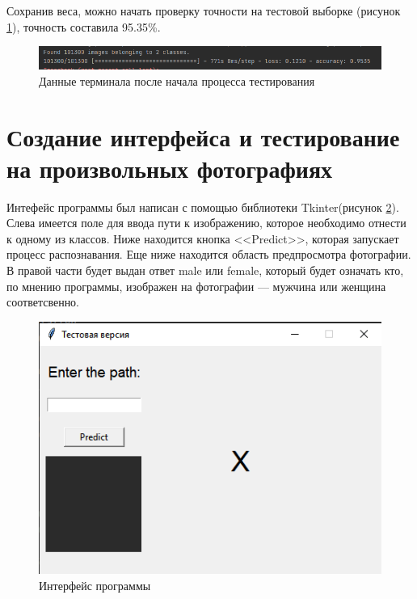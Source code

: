 Сохранив веса, можно начать проверку точности на тестовой выборке (рисунок \ref{fig:6}), точность составила 95.35\%.
\begin{figure}[!h] 
  \center
  \includegraphics [scale=0.8] {img/testset.png}
  \caption{Данные терминала после начала процесса тестирования} 
  \label{fig:6}  
\end{figure}
\section{Создание интерфейса и тестирование на произвольных фотографиях}
Интефейс программы был написан с помощью библиотеки Tkinter(рисунок \ref{fig:7}). Слева имеется поле для ввода пути к изображению, которое необходимо отнести к одному из классов. Ниже находится кнопка <<Predict>>, которая запускает процесс распознавания. Еще ниже находится область предпросмотра фотографии. В правой части будет выдан ответ male или female, который будет означать кто, по мнению программы, изображен на фотографии --- мужчина или женщина соответсвенно.
\begin{figure}[!h] 
  \center
  \includegraphics [scale=1.2] {img/interface.png}
  \caption{Интерфейс программы} 
  \label{fig:7}  
\end{figure}


